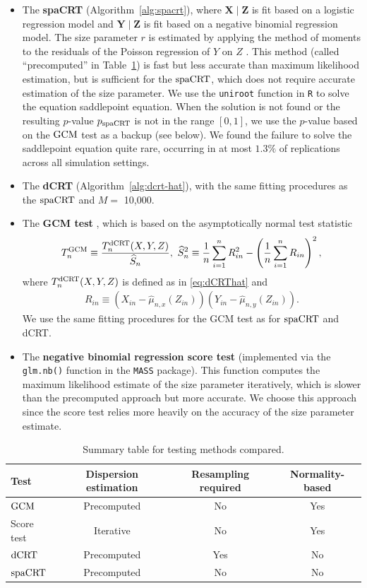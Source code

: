 \documentclass[12pt]{article}
\theoremstyle{definition}
\newcommand{\prx}{\bm X}								%
\newcommand{\srx}{X}									%
\newcommand{\prz}{\bm Z}								%
\newcommand{\srz}{Z}									%
\newcommand{\pry}{{\bm Y}}								%
\newcommand{\sry}{Y}									%
\newcommand{\dCRT}{\textnormal{dCRT}} 					%
\newcommand{\GCM}{\textnormal{GCM}}						%
\newcommand{\spacrt}{\textnormal{spaCRT}}               %
\begin{document}
\begin{itemize}
\item The \textbf{spaCRT} (Algorithm~\ref{alg:spacrt}), where $\prx \mid \prz$ is fit based on a logistic regression model and $\pry \mid \prz$ is fit based on a negative binomial regression model. The size parameter $r$ is estimated by applying the method of moments to the residuals of the Poisson regression of $Y$ on $Z$ \citep{Katsevich2020c,Barry2024}. This method (called ``precomputed'' in Table~\ref{tab:methodology_summary}) is fast but less accurate than maximum likelihood estimation, but is sufficient for the $\spacrt$, which does not require accurate estimation of the size parameter. We use the \texttt{uniroot} function in \texttt{R} to solve the equation saddlepoint equation. When the solution is not found or the resulting $p$-value $p_{\spacrt}$ is not in the range $[0,1]$, we use the $p$-value based on the $\GCM$ test as a backup (see below). {\color{red} We found the failure to solve the saddlepoint equation quite rare, occurring in at most $1.3\%$ of replications across all simulation settings.}
\item The \textbf{dCRT} (Algorithm~\ref{alg:dcrt-hat}), with the same fitting procedures as the $\spacrt$ and $M =$ 10,000.
\item The \textbf{GCM test} \citep{Shah2018}, which is based on the asymptotically normal test statistic
\begin{align*}
	T_n^{\GCM}\equiv\frac{T_n^{\dCRT}(X,Y,Z)}{\widehat{S}_n},\ \widehat{S}_n^2\equiv \frac{1}{n}\sum_{i=1}^n R_{in}^2-\left(\frac{1}{n}\sum_{i=1}^n R_{in}\right)^2,
\end{align*}
where $T_n^{\dCRT}(X,Y,Z)$ is defined as in \eqref{eq:dCRThat} and
\begin{align*}
	R_{in} \equiv (\srx_{in}-\widehat{\mu}_{n,x}(\srz_{in}))(\sry_{in}-\widehat{\mu}_{n,y}(\srz_{in})).
\end{align*}
We use the same fitting procedures for the GCM test as for $\spacrt$ and dCRT.
\item The \textbf{negative binomial regression score test} (implemented via the \verb|glm.nb()| function in the \verb|MASS| package). This function computes the  maximum likelihood estimate of the size parameter iteratively, which is slower than the precomputed approach but more accurate. We choose this approach since the score test relies more heavily on the accuracy of the size parameter estimate.
\end{itemize}

\begin{table}[!h]
  \centering
  \begin{tabular}{l|c|c|c}
  Test & Dispersion estimation & Resampling required & {\color{red} Normality-based} \\
  \hline
  $\GCM$ & Precomputed & No & Yes \\
  Score test & Iterative & No & Yes \\
  $\dCRT$ & Precomputed & Yes & No \\
  $\spacrt$ & Precomputed & No & No
  \end{tabular}
\caption{Summary table for testing methods compared.}
\label{tab:methodology_summary}
\end{table}
\end{document}
